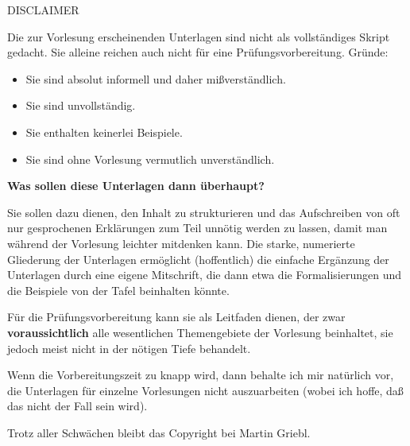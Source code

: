 \begin{titlepage}

\centerline{\huge DISCLAIMER}

\vspace*{1cm}

\large
Die zur Vorlesung erscheinenden Unterlagen sind nicht als vollständiges
Skript gedacht. Sie alleine reichen auch nicht für eine
Prüfungsvorbereitung. Gründe:
\begin{itemize}
\item Sie sind absolut informell und daher mißverständlich.
\item Sie sind unvollständig.
\item Sie enthalten keinerlei Beispiele.
\item Sie sind ohne Vorlesung vermutlich unverständlich.
\end{itemize}

\vspace*{1cm}
\textbf{Was sollen diese Unterlagen dann überhaupt?}

\vspace*{5mm}

Sie sollen dazu dienen, den Inhalt zu strukturieren und das Aufschreiben
von oft nur gesprochenen Erklärungen zum Teil unnötig werden zu lassen,
damit man während der Vorlesung leichter mitdenken kann. Die starke,
numerierte Gliederung der Unterlagen er\-möglicht (hoffentlich) die
einfache Ergänzung der Unterlagen durch eine eigene Mitschrift, die dann 
etwa die Formalisierungen und die Beispiele von der Tafel beinhalten
könnte.

\vspace*{5mm}

Für die Prüfungsvorbereitung kann sie als Leitfaden dienen, der zwar
\textbf{voraussichtlich} alle wesentlichen Themengebiete der Vorlesung
beinhaltet, sie jedoch meist nicht in der nötigen Tiefe behandelt.

\vspace*{1cm}

Wenn die Vorbereitungszeit zu knapp wird, dann behalte ich mir natürlich 
vor, die Unterlagen für einzelne Vorlesungen nicht auszuarbeiten (wobei
ich hoffe, daß das nicht der Fall sein wird).

\vspace*{1cm}

\small
Trotz aller Schwächen bleibt das Copyright bei Martin Griebl.
\end{titlepage}
